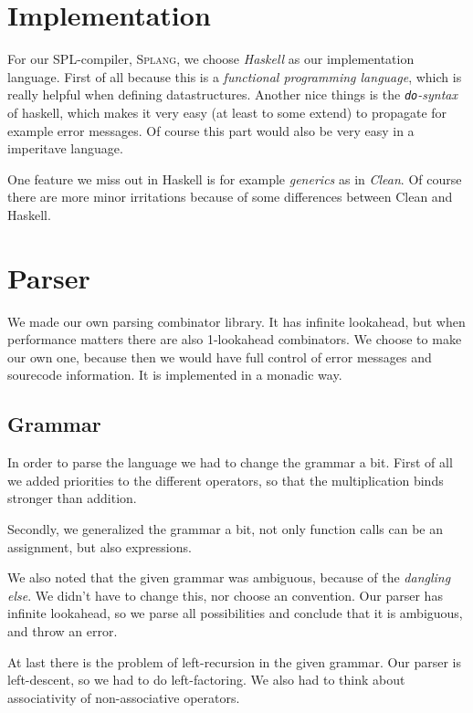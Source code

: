 \documentclass[14pt]{amsart}
\title{\splang}
\author{Wouter Geraedts \and Joshua Moerman}
\date{}
\newcommand{\splang}{\textsc{Splang}\xspace}
\begin{document}
\maketitle

\tableofcontents

\section{Implementation}
For our SPL-compiler, \splang, we choose \emph{Haskell} as our implementation language. First of all because this is a \emph{functional programming language}, which is really helpful when defining datastructures. Another nice things is the \emph{\texttt{do}-syntax} of haskell, which makes it very easy (at least to some extend) to propagate for example error messages. Of course this part would also be very easy in a imperitave language.

One feature we miss out in Haskell is for example \emph{generics} as in \emph{Clean}. Of course there are more minor irritations because of some differences between Clean and Haskell.

\section{Parser}
We made our own parsing combinator library. It has infinite lookahead, but when performance matters there are also 1-lookahead combinators. We choose to make our own one, because then we would have full control of error messages and sourecode information. It is implemented in a monadic way.

\subsection{Grammar}
In order to parse the language we had to change the grammar a bit. First of all we added priorities to the different operators, so that the multiplication binds stronger than addition.

Secondly, we generalized the grammar a bit, not only function calls can be an assignment, but also expressions.

We also noted that the given grammar was ambiguous, because of the \emph{dangling else}. We didn't have to change this, nor choose an convention. Our parser has infinite lookahead, so we parse all possibilities and conclude that it is ambiguous, and throw an error.

At last there is the problem of left-recursion in the given grammar. Our parser is left-descent, so we had to do left-factoring. We also had to think about associativity of non-associative operators.
\end{document}
